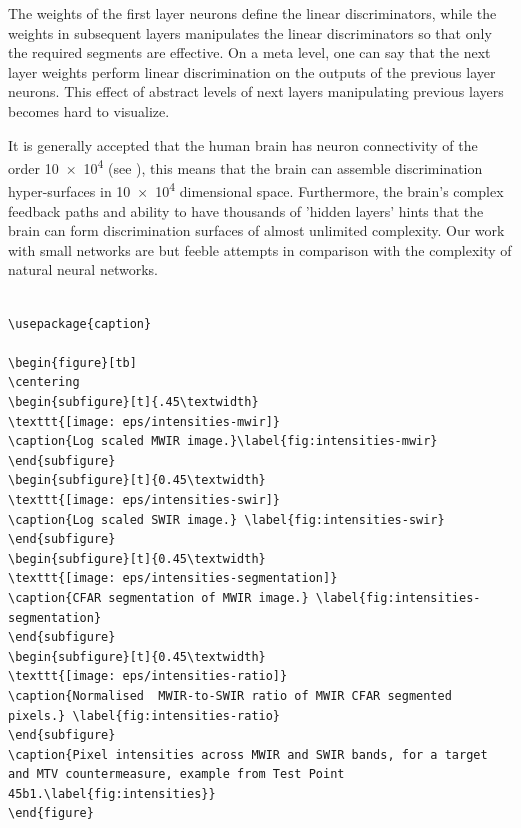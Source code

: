 The weights of the first layer neurons define the linear discriminators, while the weights in subsequent layers manipulates the linear discriminators so that only the required segments are effective.  On a meta level, one can say that the next layer weights perform linear discrimination on the outputs of the previous layer neurons.  This effect of abstract levels of next layers manipulating previous layers becomes hard to visualize.

It is generally accepted that the human brain has neuron connectivity of the order \num{10e4} (see \cite{WikiPediaNeuron2019}), this means that the brain can assemble discrimination hyper-surfaces in \num{10e4}  dimensional space.  Furthermore, the brain's complex feedback paths and ability to have thousands of 'hidden layers' hints that the brain can form discrimination surfaces of almost unlimited complexity.  Our work with small networks are but feeble attempts in comparison with the complexity of natural neural networks.  

\begin{lstlisting}

\usepackage{caption}

\begin{figure}[tb]
\centering
\begin{subfigure}[t]{.45\textwidth}
\texttt{[image: eps/intensities-mwir]}
\caption{Log scaled MWIR image.}\label{fig:intensities-mwir}
\end{subfigure}
\begin{subfigure}[t]{0.45\textwidth}
\texttt{[image: eps/intensities-swir]}
\caption{Log scaled SWIR image.} \label{fig:intensities-swir}
\end{subfigure}
\begin{subfigure}[t]{0.45\textwidth}
\texttt{[image: eps/intensities-segmentation]}
\caption{CFAR segmentation of MWIR image.} \label{fig:intensities-segmentation}
\end{subfigure}
\begin{subfigure}[t]{0.45\textwidth}
\texttt{[image: eps/intensities-ratio]}
\caption{Normalised  MWIR-to-SWIR ratio of MWIR CFAR segmented pixels.} \label{fig:intensities-ratio}
\end{subfigure}
\caption{Pixel intensities across MWIR and SWIR bands, for a target and MTV countermeasure, example from Test Point 45b1.\label{fig:intensities}}
\end{figure}


\end{lstlisting}